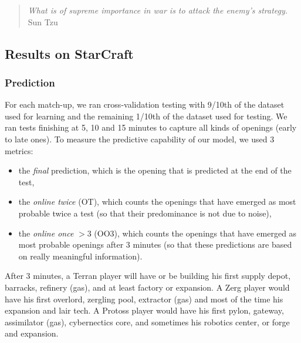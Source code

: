 \begin{quotation}\textit{
What is of supreme importance in war is to attack the enemy's strategy.}\\
Sun Tzu\end{quotation}

\label{sec:techtreepred}

\subsection{Results on StarCraft}


\subsubsection{Prediction}

For each match-up, we ran cross-validation testing with 9/10th of the dataset used for learning and the remaining 1/10th of the dataset used for testing. We ran tests finishing at 5, 10 and 15 minutes to capture all kinds of openings (early to late ones). To measure the predictive capability of our model, we used 3 metrics: 
\begin{itemize}
\item the \textit{final} prediction, which is the opening that is predicted at the end of the test, 
\item the \textit{online twice} (OT), which counts the openings that have emerged as most probable twice a test (so that their predominance is not due to noise),
\item the \textit{online once} $> 3$ (OO3), which counts the openings that have emerged as most probable openings after 3 minutes (so that these predictions are based on really meaningful information).
\end{itemize}
After 3 minutes, a Terran player will have or be building his first supply depot, barracks, refinery (gas), and at least factory or expansion. A Zerg player would have his first overlord, zergling pool, extractor (gas) and most of the time his expansion and lair tech. A Protoss player would have his first pylon, gateway, assimilator (gas), cybernectics core, and sometimes his robotics center, or forge and expansion.


